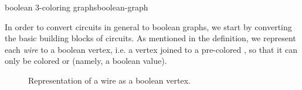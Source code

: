 \begin{definition}{boolean 3-coloring graphs}{boolean-graph}

\end{definition}

%

%
%

In order to convert circuits in general to boolean graphs, we start by
converting the basic building blocks of circuits.  As mentioned in the
definition, we represent each \emph{wire} to a boolean vertex, i.e. a vertex
joined to a pre-colored , so that it can only be colored  or
 (namely, a boolean value).

\begin{figure}[H]
\begin{center}
  \caption{Representation of a wire as a boolean vertex.}
\end{center}
\end{figure}

